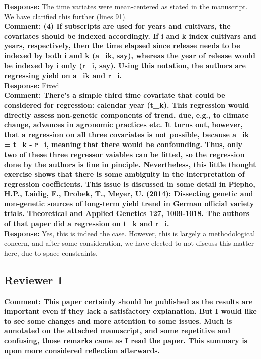 \documentclass{article} \usepackage[margin=1in]{geometry}
\begin{document}
\textbf{Response:} The time variates were mean-centered as stated in
the manuscript. We have clarified this further (lines 91).\\

\textbf{Comment: (4) If subscripts are used for years and cultivars,
  the covariates should be indexed accordingly. If i and k index
  cultivars and years, respectively, then the time elapsed since
  release needs to be indexed by both i and k (a\_ik, say), whereas
  the year of release would be indexed by i only (r\_i, say). Using
  this notation, the authors are regressing yield on a\_ik and
  r\_i.}\\

\textbf{Response:} Fixed\\

\textbf{Comment: There's a simple third time covariate that could be
  considered for regression: calendar year (t\_k). This regression
  would directly assess non-genetic components of trend, due, e.g., to
  climate change, advances in agronomic practices etc. It turns out,
  however, that a regression on all three covariates is not possible,
  because a\_ik = t\_k - r\_i, meaning that there would be
  confounding. Thus, only two of these three regressor vaiables can be
  fitted, so the regression done by the authors is fine in pinciple.
  Nevertheless, this little thought exercise shows that there is some
  ambiguity in the interpretation of regression coefficients. This
  issue is discussed in some detail in Piepho, H.P., Laidig, F.,
  Drobek, T., Meyer, U. (2014): Dissecting genetic and non-genetic
  sources of long-term yield trend in German official variety
  trials. Theoretical and Applied Genetics 127, 1009-1018. The authors
  of that paper did a regression on t\_k and r\_i.}\\

\textbf{Response:} Yes, this is indeed the case. However, this is
largely a methodological concern, and after some consideration, we
have elected to not discuss this matter here, due to space
constraints.\\

\subsection{Reviewer 1}

\textbf{Comment: This paper certainly should be published as the
  results are important even if they lack a satisfactory
  explanation. But I would like to see some changes and more attention
  to some issues. Much is annotated on the attached manuscript, and
  some repetitive and confusing, those remarks came as I read the
  paper. This summary is upon more considered reflection afterwards.}
\end{document}
